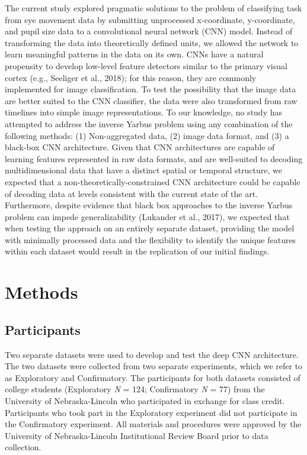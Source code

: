 \documentclass[
  english,
  man, donotrepeattitle,floatsintext]{apa6}
\begin{document}
The current study explored pragmatic solutions to the problem of classifying task from eye movement data by submitting unprocessed x-coordinate, y-coordinate, and pupil size data to a convolutional neural network (CNN) model. Instead of transforming the data into theoretically defined units, we allowed the network to learn meaningful patterns in the data on its own. CNNs have a natural propensity to develop low-level feature detectors similar to the primary visual cortex (e.g., Seeliger et al., 2018); for this reason, they are commonly implemented for image classification. To test the possibility that the image data are better suited to the CNN classifier, the data were also transformed from raw timelines into simple image representations. To our knowledge, no study has attempted to address the inverse Yarbus problem using any combination of the following methods: (1) Non-aggregated data, (2) image data format, and (3) a black-box CNN architecture. Given that CNN architectures are capable of learning features represented in raw data formats, and are well-suited to decoding multidimensional data that have a distinct spatial or temporal structure, we expected that a non-theoretically-constrained CNN architecture could be capable of decoding data at levels consistent with the current state of the art. Furthermore, despite evidence that black box approaches to the inverse Yarbus problem can impede generalizability (Lukander et al., 2017), we expected that when testing the approach on an entirely separate dataset, providing the model with minimally processed data and the flexibility to identify the unique features within each dataset would result in the replication of our initial findings.

\section{Methods}
\subsection{Participants}

Two separate datasets were used to develop and test the deep CNN architecture. The two datasets were collected from two separate experiments, which we refer to as Exploratory and Confirmatory. The participants for both datasets consisted of college students (Exploratory \emph{N} = 124; Confirmatory \emph{N} = 77) from the University of Nebraska-Lincoln who participated in exchange for class credit. Participants who took part in the Exploratory experiment did not participate in the Confirmatory experiment. All materials and procedures were approved by the University of Nebraska-Lincoln Institutional Review Board prior to data collection.
\end{document}
